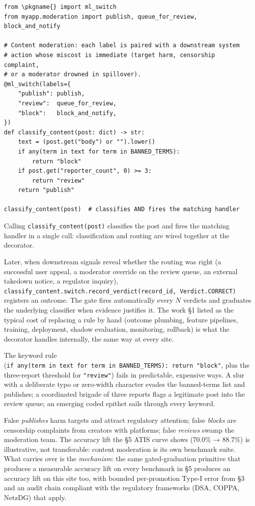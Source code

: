 \begin{verbatim}
from \pkgname{} import ml_switch
from myapp.moderation import publish, queue_for_review, block_and_notify

# Content moderation: each label is paired with a downstream system
# action whose miscost is immediate (target harm, censorship complaint,
# or a moderator drowned in spillover).
@ml_switch(labels={
    "publish": publish,
    "review":  queue_for_review,
    "block":   block_and_notify,
})
def classify_content(post: dict) -> str:
    text = (post.get("body") or "").lower()
    if any(term in text for term in BANNED_TERMS):
        return "block"
    if post.get("reporter_count", 0) >= 3:
        return "review"
    return "publish"

classify_content(post)  # classifies AND fires the matching handler
\end{verbatim}

Calling \texttt{classify\_content(post)} classifies the post and fires
the matching handler in a single call: classification and routing are
wired together at the decorator.

Later, when downstream signals reveal whether the routing was right (a
successful user appeal, a moderator override on the review queue, an
external takedown notice, a regulator inquiry),
\texttt{classify\_content.switch.record\_verdict(record\_id,\ Verdict.CORRECT)}
registers an outcome. The gate fires automatically every \(N\) verdicts
and graduates the underlying classifier when evidence justifies it. The
work §1 listed as the typical cost of replacing a rule by hand (outcome
plumbing, feature pipelines, training, deployment, shadow evaluation,
monitoring, rollback) is what the decorator handles internally, the same
way at every site.

The keyword rule
(\texttt{if\ any(term\ in\ text\ for\ term\ in\ BANNED\_TERMS):\ return\ "block"},
plus the three-report threshold for \texttt{"review"}) fails in
predictable, expensive ways. A slur with a deliberate typo or zero-width
character evades the banned-terms list and publishes; a coordinated
brigade of three reports flags a legitimate post into the review queue;
an emerging coded epithet sails through every keyword.

False \emph{publishes} harm targets and attract regulatory attention;
false \emph{blocks} are censorship complaints from creators with
platforms; false \emph{reviews} swamp the moderation team. The accuracy
lift the §5 ATIS curve shows (70.0\% → 88.7\%) is illustrative, not
transferable: content moderation is its own benchmark suite. What
carries over is the \emph{mechanism}: the same gated-graduation
primitive that produces a measurable accuracy lift on every benchmark in
§5 produces an accuracy lift on this site too, with bounded
per-promotion Type-I error from §3 and an audit chain compliant with the
regulatory frameworks (DSA, COPPA, NetzDG) that apply.


